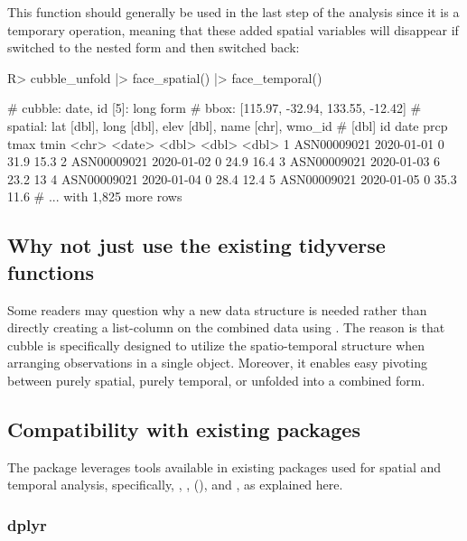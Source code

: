 \documentclass[
]{jss}
\begin{document}
This function should generally be used in the last step of the analysis since it is a temporary operation, meaning that these added spatial variables will disappear if switched to the nested form and then switched back:

\begin{CodeChunk}
\begin{CodeInput}
R> cubble_unfold |> face_spatial() |> face_temporal()
\end{CodeInput}
\begin{CodeOutput}
# cubble:  date, id [5]: long form
# bbox:    [115.97, -32.94, 133.55, -12.42]
# spatial: lat [dbl], long [dbl], elev [dbl], name [chr], wmo_id
#   [dbl]
  id          date        prcp  tmax  tmin
  <chr>       <date>     <dbl> <dbl> <dbl>
1 ASN00009021 2020-01-01     0  31.9  15.3
2 ASN00009021 2020-01-02     0  24.9  16.4
3 ASN00009021 2020-01-03     6  23.2  13  
4 ASN00009021 2020-01-04     0  28.4  12.4
5 ASN00009021 2020-01-05     0  35.3  11.6
# ... with 1,825 more rows
\end{CodeOutput}
\end{CodeChunk}

\hypertarget{tidyverse}{%
\subsection{Why not just use the existing tidyverse functions}\label{tidyverse}}

Some readers may question why a new data structure is needed rather than directly creating a list-column on the combined data using . The reason is that cubble is specifically designed to utilize the spatio-temporal structure when arranging observations in a single object. Moreover, it enables easy pivoting between purely spatial, purely temporal, or unfolded into a combined form.

\hypertarget{compact}{%
\subsection{Compatibility with existing packages}\label{compact}}

The  package leverages tools available in existing packages used for spatial and temporal analysis, specifically, , ,  (), and , as explained here.

\hypertarget{dplyr}{%
\subsubsection{dplyr}\label{dplyr}}
\end{document}
